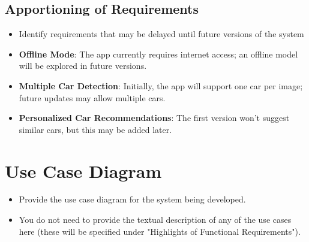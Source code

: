 \documentclass[]{article}
\begin{document}
\subsection{Apportioning of Requirements}
\label{sub:apportioning_of_requirements}
\begin{itemize}
	\item Identify requirements that may be delayed until future versions of the system
	\item \textbf{Offline Mode}: The app currently requires internet access; an offline model will be explored in future versions.
    \item \textbf{Multiple Car Detection}: Initially, the app will support one car per image; future updates may allow multiple cars.
    \item \textbf{Personalized Car Recommendations}: The first version won’t suggest similar cars, but this may be added later.
\end{itemize}

\section{Use Case Diagram}
\label{sec:use_case_diagram}
\begin{itemize}
	\item Provide the use case diagram for the system being developed.
	\item You do not need to provide the textual description of any of the use cases here (these will be specified under "Highlights of Functional Requirements").
\end{itemize}
\end{document}
